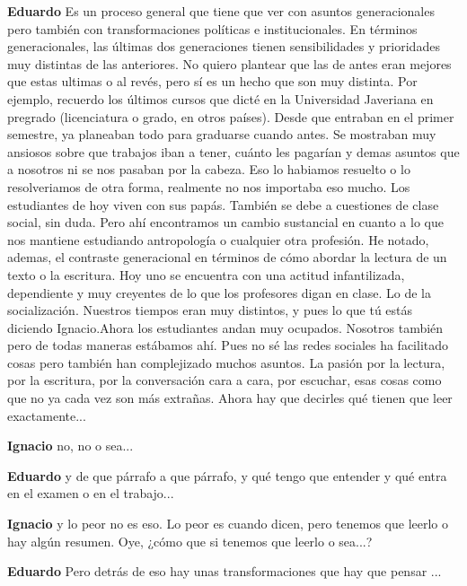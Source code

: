 \documentclass[
  spanish,
  11pt,
  a4paper,
]{scrbook}
\newenvironment{transcripcion}{
    \begin{list}{}{
        \setlength{\leftmargin}{1.5em}  %
        \setlength{\rightmargin}{0em}
        \setlength{\itemsep}{0.2em}     %
        \setlength{\parsep}{0.0em}
        \setlength{\listparindent}{0pt}
    }
}{
    \end{list}
}
\newcommand{\personaje}[1]{\textbf{#1}\quad}
\begin{document}
\begin{transcripcion}
\item \personaje{Eduardo} Es un proceso general que tiene que ver con asuntos generacionales pero también con transformaciones políticas e institucionales. En términos generacionales, las últimas dos generaciones tienen sensibilidades y prioridades muy distintas de las anteriores. No quiero plantear que las de antes eran mejores que estas ultimas o al revés, pero sí es un hecho que son muy distinta. Por ejemplo, recuerdo los últimos cursos que dicté en la Universidad Javeriana en pregrado (licenciatura o grado, en otros países). Desde que entraban en el primer semestre, ya planeaban todo para graduarse cuando antes. Se mostraban muy ansiosos sobre que trabajos iban a tener, cuánto les pagarían y demas asuntos que a nosotros ni se nos pasaban por la cabeza. Eso lo habiamos resuelto o lo resolveriamos de otra forma, realmente no nos importaba eso mucho. Los estudiantes de hoy viven con sus papás. También se debe a cuestiones de clase social, sin duda. Pero ahí encontramos un cambio sustancial en cuanto a lo que nos mantiene estudiando antropología o cualquier otra profesión. He notado, ademas, el contraste generacional en términos de cómo abordar la lectura de un texto o la escritura. Hoy uno se encuentra con una actitud infantilizada, dependiente y muy creyentes de lo que los profesores digan en clase. Lo de la socialización. Nuestros tiempos eran muy distintos, y pues lo que tú estás diciendo Ignacio.Ahora los estudiantes andan muy ocupados. Nosotros también pero de todas maneras estábamos ahí. Pues no sé las redes sociales ha facilitado cosas pero también han complejizado muchos asuntos. La pasión por la lectura, por la escritura, por la conversación cara a cara, por escuchar, esas cosas como que no ya cada vez son más extrañas. Ahora hay que decirles qué tienen que leer exactamente...

\item \personaje{Ignacio} no, no o sea...

\item \personaje{Eduardo} y de que párrafo a que párrafo, y qué tengo que entender y qué entra en el examen o en el trabajo...

\item \personaje{Ignacio} y lo peor no es eso. Lo peor es cuando dicen, pero tenemos que leerlo o hay algún resumen. Oye, ¿cómo que si tenemos que leerlo o sea...?

\item \personaje{Eduardo} Pero detrás de eso hay unas transformaciones que hay que pensar ...


\end{transcripcion}
\end{document}
